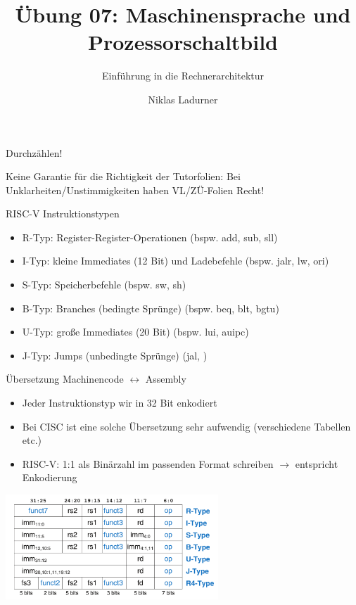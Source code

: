 \documentclass[
  german,            %
  aspectratio=169,    %
]{tumbeamer}
\title{Übung 07: Maschinensprache und \\Prozessorschaltbild}
\subtitle{Einführung in die Rechnerarchitektur}
\author{Niklas Ladurner}
\institute{\theChairName\\\theDepartmentName\\\theUniversityName}
\date{\DTMdisplaydate{2023}{12}{1}{-1}}
\begin{document}
\maketitle

\begin{frame}[c]{}{}
  \begin{center}
    \LARGE  Durchzählen!
  \end{center}
\end{frame}

\begin{frame}[c]{}{}
  \begin{center}
    \LARGE  Keine Garantie für die Richtigkeit der Tutorfolien: Bei Unklarheiten/Unstimmigkeiten
    haben VL/ZÜ-Folien Recht!
  \end{center}
\end{frame}

\begin{frame}[fragile, c]{RISC-V Instruktionstypen}{}
  \begin{itemize}
    \item R-Typ: Register-Register-Operationen (bspw. add, sub, sll)
    \item I-Typ: kleine Immediates (12 Bit) und Ladebefehle (bspw. jalr, lw, ori)
    \item S-Typ: Speicherbefehle (bspw. sw, sh)
    \item B-Typ: Branches (bedingte Sprünge) (bspw. beq, blt, bgtu)
    \item U-Typ: große Immediates (20 Bit) (bspw. lui, auipc)
    \item J-Typ: Jumps (unbedingte Sprünge) (jal, )
  \end{itemize}
\end{frame}

\begin{frame}[c, fragile]{Übersetzung Machinencode $\leftrightarrow$ Assembly}{}
  \begin{itemize}
    \item Jeder Instruktionstyp wir in 32 Bit enkodiert
    \item Bei CISC ist eine solche Übersetzung sehr aufwendig (verschiedene Tabellen etc.)
    \item RISC-V: 1:1 als Binärzahl im passenden Format schreiben $\rightarrow$ entspricht Enkodierung
  \end{itemize}
  \begin{center}
    \includegraphics[width=0.6\textwidth]{w07_types.png}
  \end{center}
\end{frame}
\end{document}
